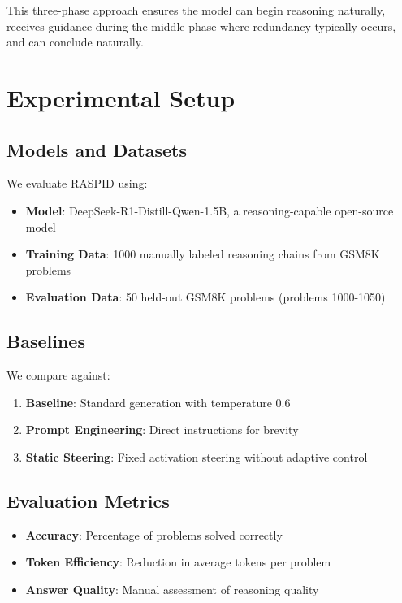 \documentclass{article}
\begin{document}
This three-phase approach ensures the model can begin reasoning naturally, receives guidance during the middle phase where redundancy typically occurs, and can conclude naturally.

\section{Experimental Setup}

\subsection{Models and Datasets}

We evaluate RASPID using:
\begin{itemize}
\item \textbf{Model}: DeepSeek-R1-Distill-Qwen-1.5B, a reasoning-capable open-source model
\item \textbf{Training Data}: 1000 manually labeled reasoning chains from GSM8K problems
\item \textbf{Evaluation Data}: 50 held-out GSM8K problems (problems 1000-1050)
\end{itemize}

\subsection{Baselines}

We compare against:
\begin{enumerate}
\item \textbf{Baseline}: Standard generation with temperature 0.6
\item \textbf{Prompt Engineering}: Direct instructions for brevity
\item \textbf{Static Steering}: Fixed activation steering without adaptive control
\end{enumerate}

\subsection{Evaluation Metrics}

\begin{itemize}
\item \textbf{Accuracy}: Percentage of problems solved correctly
\item \textbf{Token Efficiency}: Reduction in average tokens per problem
\item \textbf{Answer Quality}: Manual assessment of reasoning quality
\end{itemize}
\end{document}
